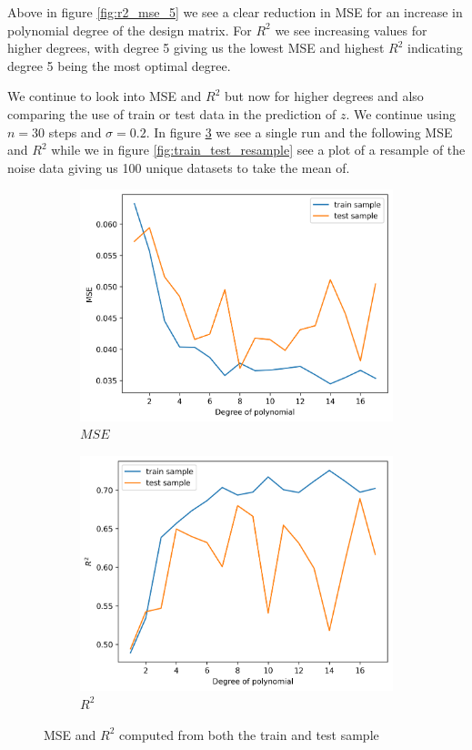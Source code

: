 \documentclass[12pt]{article}
\begin{document}
Above in figure \ref{fig:r2_mse_5} we see a clear reduction in MSE for an increase in polynomial degree of the design matrix. For $R^2$ we see increasing values for higher degrees, with degree 5 giving us the lowest MSE and highest $R^2$ indicating degree 5 being the most optimal degree.

We continue to look into MSE and $R^2$ but now for higher degrees and also comparing the use of train or test data in the prediction of $z$. We continue using $n=30$ steps and $\sigma=0.2$. In figure \ref{fig:train_test} we see a single run and the following MSE and $R^2$ while we in figure \ref{fig:train_test_resample} see a plot of a resample of the noise data giving us 100 unique datasets to take the mean of.
\begin{figure}[H]
  \begin{subfigure}{.5\textwidth}
    \centering
    \includegraphics[width=\textwidth]{../figures/mse_train_test.png}
    \caption{$MSE$}
    \label{fig:}
  \end{subfigure}
  \begin{subfigure}{.5\textwidth}
    \centering
    \includegraphics[width=\textwidth]{../figures/r2_train_test.png}
    \caption{$R^2$}
    \label{fig:}
  \end{subfigure}
  \caption{MSE and $R^2$ computed from both the train and test sample}
  \label{fig:train_test}
\end{figure}
\end{document}
